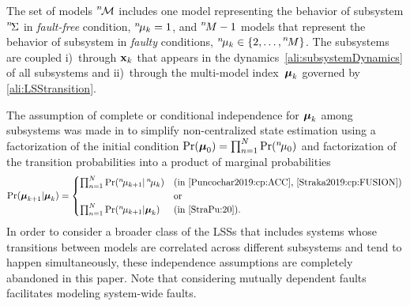\documentclass[conference,10pt]{IEEEtran}
\def\ist{\prescript{1\!}{}}
\def\nth{\prescript{n\!}{}}
\def\Nth{\prescript{N\!}{}}
\begin{document}
The set of models $\nth{\mcM}$ includes one model representing the behavior of subsystem $\nth{\Sigma}$ in \emph{fault-free} condition, $\nth{\mu}_{k}=1$, and $\nth{M}-1$ models that represent the behavior of subsystem in \emph{faulty} conditions, $\nth{\mu}_{k}\in\{2,\ldots,\nth{M}\}$.  
The subsystems are coupled i)~through $\mathbf{x}_k$ that appears in the dynamics~\eqref{ali:subsystemDynamics} of all subsystems and ii)~through the multi-model index~$\boldsymbol{\mu}_k$ governed by \eqref{ali:LSStransition}.


The assumption of complete or conditional independence for $\boldsymbol{\mu}_{k}$ among subsystems was made in  \cite{Puncochar2019:cp:ACC,Straka2019:cp:FUSION,StraPu:20} to simplify non-centralized state estimation using a factorization of the initial condition $\Pr(\bfmu_{0})=\prod_{n=1}^{N}\Pr(\nth{\mu}_{0})$ and factorization of the transition probabilities into a product of marginal probabilities
\begin{align}
	\Pr(\bfmu_{k+1}|\bfmu_{k})=
  \begin{cases}
    \prod_{n=1}^N\Pr(\nth{\mu}_{k+1}|\nth{\mu}_{k}) & \text{(in~\cite{Puncochar2019:cp:ACC},~\cite{Straka2019:cp:FUSION})}\\
                                                    &\text{or}\\
    \prod_{n=1}^N\Pr(\nth{\mu}_{k+1}|\bfmu_{k}) & \text{(in~\cite{StraPu:20})}.
  \end{cases}
\end{align}
In order to consider a broader class of the LSSs that includes systems whose transitions between models are correlated across different subsystems and tend to happen simultaneously, these independence assumptions are completely abandoned in this paper.
Note that considering mutually dependent faults facilitates modeling system-wide faults.
\end{document}
